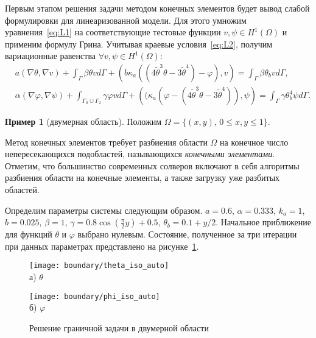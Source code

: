 Первым этапом решения задачи методом конечных элементов будет вывод слабой формулировки для
линеаризованной модели.
Для этого умножим уравнения~\eqref{eq:L1} на соответствующие тестовые функции
$v, \psi \in H^1(\Omega)$ и применим формулу Грина.
Учитывая краевые условия~\eqref{eq:L2},
получим вариационные равенства $\forall v, \psi \in H^1(\Omega)$:
\begin{equation*}
    \begin{aligned}
        & a( \nabla \theta, \nabla v ) + \int_\Gamma \beta \theta v d\Gamma
        + \left(b \kappa_a (\left(4 \widetilde{\theta}^{3}
        \theta-3 \widetilde{\theta}^{4}\right) - \varphi ), v\right)
        = \int_\Gamma \beta \theta_b v d\Gamma,
        \\
        & \alpha (\nabla \varphi,\nabla \psi)
        + \int_{\Gamma_0 \cup \Gamma_2} \gamma \varphi v d\Gamma
        + \left( (\kappa_a (\varphi - \left(4 \widetilde{\theta}^{3}
        \theta-3 \widetilde{\theta}^{4}\right)), \psi\right)
        = \int_{\Gamma} \gamma \theta_b^4 \psi d\Gamma.
    \end{aligned}
\end{equation*}

\textbf{Пример 1} (двумерная область).
Положим $\Omega=\{(x,y),\, 0 \leq x,y \leq 1 \}$.

Метод конечных элементов требует разбиения области $\Omega$ на
конечное число непересекающихся подобластей, называющихся
\textit{конечными элементами}.
Отметим, что большинство современных солверов включают в себя
алгоритмы разбиения области на конечные элементы, а также загрузку
уже разбитых областей.

Определим параметры системы следующим образом.
$a = 0.6$,
$\alpha = 0.333$,
$k_a = 1$,
$b = 0.025$,
$\beta = 1$,
$\gamma = 0.8 \cos\left(\frac{\pi}{2} y\right) + 0.5$,
$\theta_b = 0.1 + y / 2$.
Начальное приближение для функций $\theta$ и $\varphi$ выбрано нулевым.
Состояние, полученное за три итерации при данных параметрах представлено
на рисунке~\ref{fig:4_1:boundary}.
\begin{figure}[h!t]
    \begin{minipage}[b][][b]{0.49\linewidth}
        \centering
        \texttt{[image: boundary/theta\_iso\_auto]} \\ а) $\theta$
    \end{minipage}
    \hfill
    \begin{minipage}[b][][b]{0.49\linewidth}
        \centering
        \texttt{[image: boundary/phi\_iso\_auto]} \\ б) $\varphi$
    \end{minipage}
    \caption{Решение граничной задачи в двумерной области}
    \label{fig:4_1:boundary}
\end{figure}


